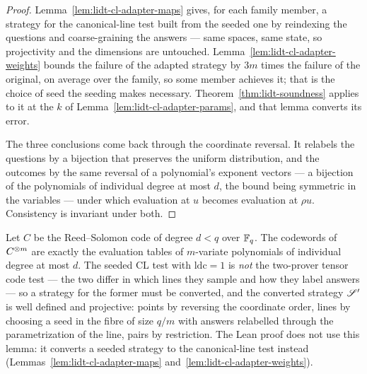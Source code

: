 \begin{proof}
\leanok
Lemma~\ref{lem:lidt-cl-adapter-maps} gives, for each family member, a strategy for the
canonical-line test built from the seeded one by reindexing the questions and coarse-graining the
answers --- same spaces, same state, so projectivity and the dimensions are untouched.
Lemma~\ref{lem:lidt-cl-adapter-weights} bounds the failure of the adapted strategy by $3m$ times
the failure of the original, on average over the family, so some member achieves it; that is the
choice of seed the seeding makes necessary. Theorem~\ref{thm:lidt-soundness} applies to it at the
$k$ of Lemma~\ref{lem:lidt-cl-adapter-params}, and that lemma converts its error.

The three conclusions come back through the coordinate reversal. It relabels the questions by a
bijection that preserves the uniform distribution, and the outcomes by the same reversal of a
polynomial's exponent vectors --- a bijection of the polynomials of individual degree at most $d$,
the bound being symmetric in the variables --- under which evaluation at $u$ becomes evaluation at
$\rho u$. Consistency is invariant under both.
\end{proof}

\effortMedium

\begin{lemma}
\label{lem:lidt-reduction-setup}
Let $C$ be the Reed--Solomon code of degree $d<q$ over $\mathbb{F}_q$. The codewords of $C^{\otimes m}$ are
exactly the evaluation tables of $m$-variate polynomials of individual degree at most $d$. The
seeded CL test with $\mathrm{ldc}=1$ is \emph{not} the two-prover tensor code test --- the two differ in
which lines they sample and how they label answers --- so a strategy for the former must be
converted, and the converted strategy $\mathscr{S}'$ is well defined and projective: points by
reversing the coordinate order, lines by choosing a seed in the fibre of size $q/m$ with
answers relabelled through the parametrization of the line, pairs by restriction.
The Lean proof does not use this lemma: it converts a seeded strategy to the canonical-line
test instead (Lemmas~\ref{lem:lidt-cl-adapter-maps} and~\ref{lem:lidt-cl-adapter-weights}).
\end{lemma}

\effortHard

